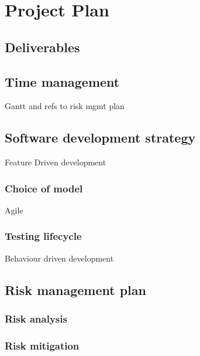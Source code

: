 \chapter{Project Plan}
\label{chap:project-plan}

\section{Deliverables}

\section{Time management}
Gantt and refs to risk mgmt plan
\section{Software development strategy}
Feature Driven development
\subsection{Choice of model}
Agile
\subsection{Testing lifecycle}
Behaviour driven development
\section{Risk management plan}
\subsection{Risk analysis}
\subsection{Risk mitigation}